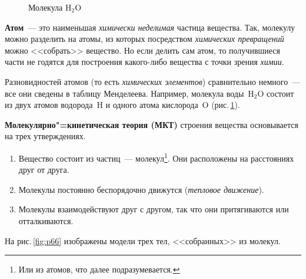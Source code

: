 \documentclass[main.tex]{subfiles}
\begin{document}
{%
\setlength\intextsep{0pt}
\begin{figure}
    \centering
    \caption{Молекула H$_2$O}
    \label{fig:p65}
\end{figure}

\textbf{Атом}~--- это наименьшая \emph{химически неделимая} частица вещества. Так, молекулу можно разделить на атомы, из которых посредством \emph{химических превращений} можно <<собрать>> вещество.
Но если делить сам атом, то получившиеся части не годятся для построения какого-либо вещества с точки зрения \emph{химии}.

Разновидностей атомов (то есть \emph{химических элементов}) сравнительно немного~--- все они сведены в таблицу Менделеева. Например, молекула воды~H$_2$O состоит из двух атомов водорода~H и одного атома кислорода~O (рис.\,\ref{fig:p65}).   

}
\textbf{Молекулярно"=кинетическая теория (МКТ)} строения вещества основывается на трех утверждениях.

\begin{enumerate}
    \item Вещество состоит из частиц~--- молекул\footnote{Или из атомов, что далее подразумевается.}. Они расположены на расстояниях друг от друга.
    \item Молекулы постоянно беспорядочно движутся (\emph{тепловое движение}).
    \item Молекулы взаимодействуют друг с другом, так что они притягиваются или отталкиваются.
\end{enumerate}

На рис.\,\ref{fig:p66} изображены модели трех тел, <<собранных>> из молекул.
\end{document}
